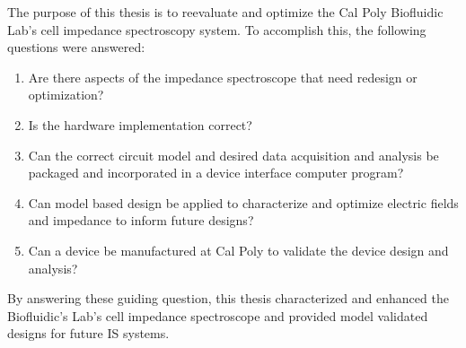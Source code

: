 \par The purpose of this thesis is to reevaluate and optimize the Cal Poly Biofluidic Lab's cell impedance spectroscopy system. To accomplish this, the following questions were answered:
\begin{enumerate}
    \item Are there aspects of the impedance spectroscope that need redesign or optimization?
    \item Is the hardware implementation correct?
    \item Can the correct circuit model and desired data acquisition and analysis be packaged and incorporated in a device interface computer program?
    \item Can model based design be applied to characterize and optimize electric fields and impedance to inform future designs?
    \item Can a device be manufactured at Cal Poly to validate the device design and analysis?
\end{enumerate}

\noindent By answering these guiding question, this thesis characterized and enhanced the Biofluidic's Lab's cell impedance spectroscope and provided model validated designs for future IS systems. 